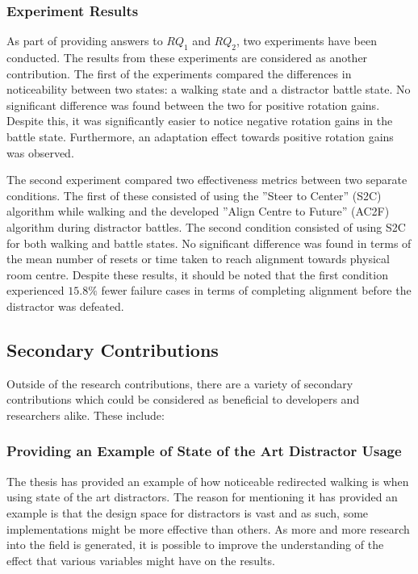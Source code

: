 \subsubsection{Experiment Results}
As part of providing answers to $RQ_1$ and $RQ_2$, two experiments have been conducted. The results from these experiments are considered as another contribution. The first of the experiments compared the differences in noticeability between two states: a walking state and a distractor battle state. No significant difference was found between the two for positive rotation gains. Despite this, it was significantly easier to notice negative rotation gains in the battle state. Furthermore, an adaptation effect towards positive rotation gains was observed.

The second experiment compared two effectiveness metrics between two separate conditions. The first of these consisted of using the ''Steer to Center'' (S2C) algorithm while walking and the developed ''Align Centre to Future'' (AC2F) algorithm during distractor battles. The second condition consisted of using S2C for both walking and battle states. No significant difference was found in terms of the mean number of resets or time taken to reach alignment towards physical room centre. Despite these results, it should be noted that the first condition experienced $15.8\%$ fewer failure cases in terms of completing alignment before the distractor was defeated. 

\subsection{Secondary Contributions}
Outside of the research contributions, there are a variety of secondary contributions which could be considered as beneficial to developers and researchers alike. These include:

\subsubsection{Providing an Example of State of the Art Distractor Usage}
The thesis has provided an example of how noticeable redirected walking is when using state of the art distractors. The reason for mentioning it has provided an example is that the design space for distractors is vast and as such, some implementations might be more effective than others. As more and more research into the field is generated, it is possible to improve the understanding of the effect that various variables might have on the results. 

